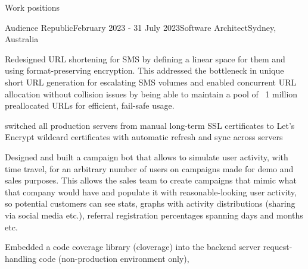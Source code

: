 \documentclass{resume} %
\begin{document}
\begin{rSection}{Work positions}
\begin{rSubsection}{Audience Republic}{February 2023 - 31 July 2023}{Software Architect}{Sydney, Australia} %
\item Redesigned URL shortening for SMS by defining a linear space for them and using format-preserving encryption.
  This addressed the bottleneck in unique short URL generation for escalating SMS volumes and enabled concurrent URL
  allocation without collision issues by being able to maintain a pool of ~1 million preallocated URLs for efficient,
  fail-safe usage.
\item switched all production servers from manual long-term SSL certificates to Let's Encrypt wildcard certificates with automatic
    refresh and sync across servers 
\item Designed and built a campaign bot that allows to simulate user activity, with time travel, for an arbitrary number of users on
    campaigns made for demo and sales purposes. This allows the sales team to create campaigns that mimic what that company would
    have and populate it with reasonable-looking user activity, so potential customers can see stats, graphs with activity
    distributions (sharing via social media etc.), referral registration percentages spanning days and months etc.
\item Embedded a code coverage library (cloverage) into the backend server request-handling code (non-production environment only),

\end{rSubsection}
\end{rSection}
\end{document}
